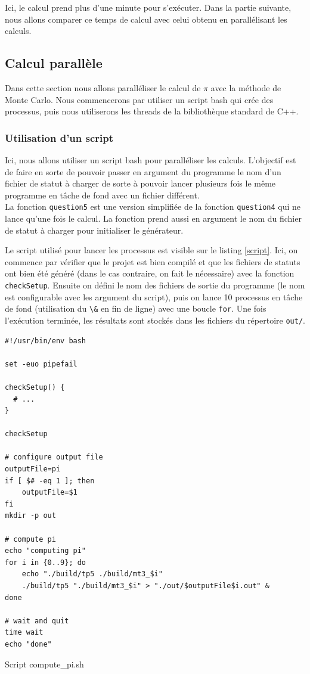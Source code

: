 \documentclass[a4paper]{article}
\begin{document}
Ici, le calcul prend plus d'une minute pour s'exécuter. Dans la partie suivante,
nous allons comparer ce temps de calcul avec celui obtenu en parallélisant les
calculs.

\subsection{Calcul parallèle}

Dans cette section nous allons paralléliser le calcul de $\pi$ avec la méthode
de Monte Carlo. Nous commencerons par utiliser un script bash qui crée des
processus, puis nous utiliserons les threads de la bibliothèque standard de C++.

\subsubsection{Utilisation d'un script}
\label{sec:script}

Ici, nous allons utiliser un script bash pour paralléliser les calculs.
L'objectif est de faire en sorte de pouvoir passer en argument du programme le
nom d'un fichier de statut à charger de sorte à pouvoir lancer plusieurs fois le
même programme en tâche de fond avec un fichier différent.\\

La fonction \lstinline{question5} est une version simplifiée de la fonction
\lstinline{question4} qui ne lance qu'une fois le calcul. La fonction prend
aussi en argument le nom du fichier de statut à charger pour initialiser le
générateur.

Le script utilisé pour lancer les processus est visible sur le listing
\ref{script}. Ici, on commence par vérifier que le projet est bien compilé et
que les fichiers de statuts ont bien été généré (dans le cas contraire, on fait
le nécessaire) avec la fonction \lstinline{checkSetup}. Ensuite on défini le nom
des fichiers de sortie du programme (le nom est configurable avec les argument
du script), puis on lance 10 processus en tâche de fond (utilisation du
\lstinline{\&} en fin de ligne) avec une boucle \lstinline{for}. Une fois
l'exécution terminée, les résultats sont stockés dans les fichiers du répertoire
\lstinline{out/}.

\begin{listing}[ht!]
\begin{verbatim}
#!/usr/bin/env bash

set -euo pipefail

checkSetup() {
  # ...
}

checkSetup

# configure output file
outputFile=pi
if [ $# -eq 1 ]; then
    outputFile=$1
fi
mkdir -p out

# compute pi
echo "computing pi"
for i in {0..9}; do
    echo "./build/tp5 ./build/mt3_$i"
    ./build/tp5 "./build/mt3_$i" > "./out/$outputFile$i.out" &
done

# wait and quit
time wait
echo "done"
\end{verbatim}
\caption{Script compute\_pi.sh}
\label{script}
\end{listing}
\end{document}
